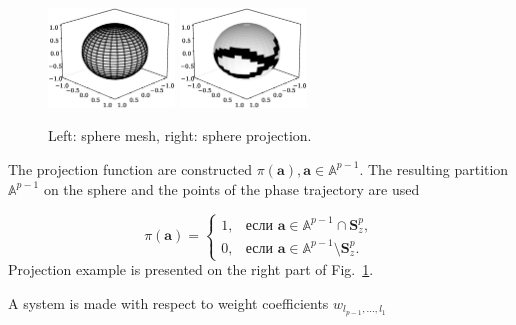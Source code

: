\documentclass[12pt,twoside]{article}
\begin{document}
\begin{otherlanguage}{english}
\begin{figure}[h]
\centering
  {\includegraphics[width=0.3\textwidth]{figs/sphere_grid.eps}}
  {\includegraphics[width=0.3\textwidth]{figs/pi_walk.eps}}\\
\caption{Left: sphere mesh, right: sphere projection.}
\label{fg:sp_mesh}
\end{figure}
\end{otherlanguage}

The projection function are constructed  $\pi(\mathbf{a}), \mathbf{a} \in \mathbb{A}^ {p-1}$. The resulting partition $\mathbb{A}^{p-1}$ on the sphere and the points of the phase trajectory are used

\begin{equation}
    \pi(\mathbf{a}) =
    \begin{cases}
	1, & \mbox{если } \mathbf{a} \in \mathbb{A}^{p-1} \cap \mathbf{S}_{z}^{p},\\
    0, & \mbox{если } \mathbf{a} \in \mathbb{A}^{p-1} \setminus \mathbf{S}_{z}^{p}.
    \end{cases}
\label{eq:f_real}
\end{equation}
Projection example is presented on the right part of Fig.~\ref{fg:sp_mesh}.

A system is made with respect to weight coefficients $w_{l_{p-1},...,l_1}$ 
\end{document}
